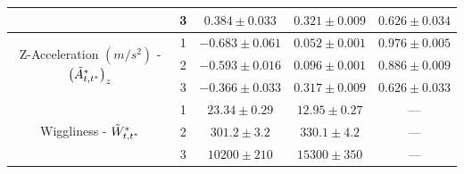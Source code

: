 \begin{table}[ht]
{\begin{tabular}{ccccc}
                                                                                   & 3                                    & $0.384  \pm 0.033$  & $0.321 \pm 0.009$ & $0.626 \pm 0.034$ \\ \hline
    \multirow{3}{*}{Z-Acceleration $(m/s^2)$ - $\left(\tilde{A}^*_{t,t^*}\right)_z$}     & 1                                    & $-0.683 \pm 0.061$  & $0.052 \pm 0.001$ & $0.976 \pm 0.005$ \\
                                                                                   & 2                                    & $-0.593 \pm 0.016$  & $0.096 \pm 0.001$ & $0.886 \pm 0.009$ \\
                                                                                   & 3                                    & $-0.366 \pm 0.033$  & $0.317 \pm 0.009$ & $0.626 \pm 0.033$ \\ \hline
    \multirow{3}{*}{Wiggliness - $\tilde{W}^*_{t,t^*}$}                                  & 1                                    & $23.34  \pm 0.29$   & $12.95 \pm 0.27$  & ---               \\
                                                                                   & 2                                    & $301.2  \pm 3.2$    & $330.1 \pm 4.2$   & ---               \\
                                                                                   & 3                                    & $10200  \pm 210$    & $15300 \pm 350$   & ---               \\ \hline
    \end{tabular}
    }
    \label{table:emis_dists_CarHHMM-DFT}
\end{table}

